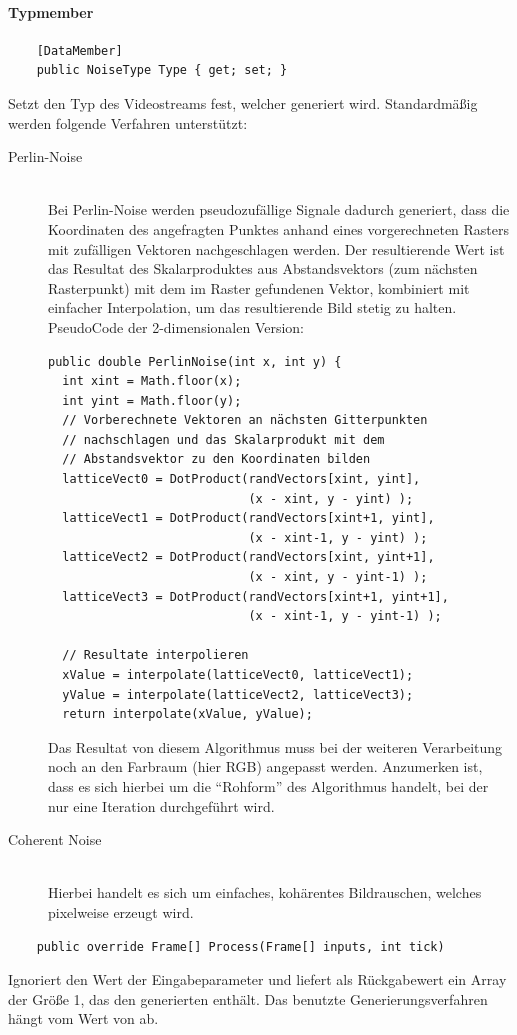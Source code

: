\paragraph{Typmember}
\begin{itemize}

	\begin{verbatim}
	[DataMember]
	public NoiseType Type { get; set; }
	\end{verbatim}
	Setzt den Typ des Videostreams fest, welcher generiert wird. Standardmäßig werden folgende Verfahren unterstützt:
	\begin{description}
		\item[Perlin-Noise]~\\
		Bei Perlin-Noise werden pseudozufällige Signale dadurch generiert, dass die Koordinaten des angefragten Punktes anhand eines vorgerechneten Rasters mit zufälligen Vektoren nachgeschlagen werden. Der resultierende Wert ist das Resultat des Skalarproduktes aus Abstandsvektors (zum nächsten Rasterpunkt) mit dem im Raster gefundenen Vektor, kombiniert mit einfacher Interpolation, um das resultierende Bild stetig zu halten. PseudoCode der 2-dimensionalen Version:
\begin{verbatim}
public double PerlinNoise(int x, int y) {
  int xint = Math.floor(x);
  int yint = Math.floor(y);
  // Vorberechnete Vektoren an nächsten Gitterpunkten
  // nachschlagen und das Skalarprodukt mit dem 
  // Abstandsvektor zu den Koordinaten bilden
  latticeVect0 = DotProduct(randVectors[xint, yint],
                            (x - xint, y - yint) );
  latticeVect1 = DotProduct(randVectors[xint+1, yint], 
                            (x - xint-1, y - yint) );
  latticeVect2 = DotProduct(randVectors[xint, yint+1], 
                            (x - xint, y - yint-1) );
  latticeVect3 = DotProduct(randVectors[xint+1, yint+1], 
                            (x - xint-1, y - yint-1) );

  // Resultate interpolieren
  xValue = interpolate(latticeVect0, latticeVect1);
  yValue = interpolate(latticeVect2, latticeVect3);
  return interpolate(xValue, yValue);
\end{verbatim}
        Das Resultat von diesem Algorithmus muss bei der weiteren Verarbeitung noch an den Farbraum (hier RGB) angepasst werden. Anzumerken ist, dass es sich hierbei um die ``Rohform'' des Algorithmus handelt, bei der nur eine Iteration durchgeführt wird.
		\item[Coherent Noise]~\\
		Hierbei handelt es sich um einfaches, kohärentes Bildrauschen, welches pixelweise erzeugt wird.
	\end{description}

	\begin{verbatim}
	public override Frame[] Process(Frame[] inputs, int tick)
	\end{verbatim}
	Ignoriert den Wert der Eingabeparameter und liefert als Rückgabewert ein Array der Größe 1, das den generierten  enthält. Das benutzte Generierungsverfahren hängt vom Wert von  ab.


\end{itemize}

